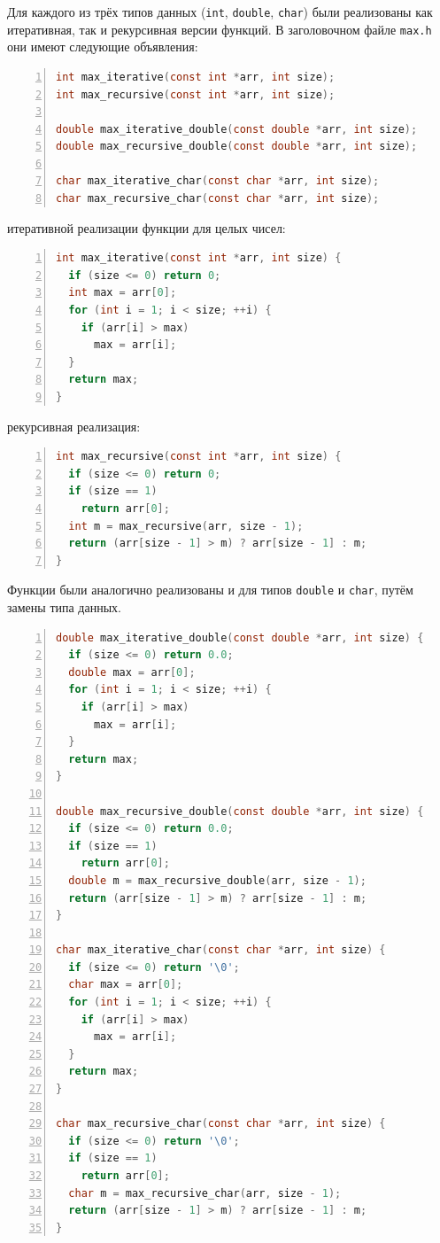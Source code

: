 Для каждого из трёх типов данных (\texttt{int}, \texttt{double}, \texttt{char}) были реализованы как итеративная, так и рекурсивная версии функций. В заголовочном файле \texttt{max.h} они имеют следующие объявления:

\begin{lstlisting}[language=C, numbers=left, caption=Заголовочный файл max.h]
int max_iterative(const int *arr, int size);
int max_recursive(const int *arr, int size);

double max_iterative_double(const double *arr, int size);
double max_recursive_double(const double *arr, int size);

char max_iterative_char(const char *arr, int size);
char max_recursive_char(const char *arr, int size);
\end{lstlisting}

 итеративной реализации функции для целых чисел:
\begin{lstlisting}[language=C, numbers=left, caption=Итеративная реализация max для int]
int max_iterative(const int *arr, int size) {
  if (size <= 0) return 0;
  int max = arr[0];
  for (int i = 1; i < size; ++i) {
    if (arr[i] > max)
      max = arr[i];
  }
  return max;
}
\end{lstlisting}

 рекурсивная реализация:
\begin{lstlisting}[language=C, numbers=left, caption=Рекурсивная реализация max для int]
int max_recursive(const int *arr, int size) {
  if (size <= 0) return 0;
  if (size == 1)
    return arr[0];
  int m = max_recursive(arr, size - 1);
  return (arr[size - 1] > m) ? arr[size - 1] : m;
}
\end{lstlisting}

Функции были аналогично реализованы и для типов \texttt{double} и \texttt{char}, путём замены типа данных.

\begin{lstlisting}[language=C, numbers=left, caption=Реализация max для double и char]
double max_iterative_double(const double *arr, int size) {
  if (size <= 0) return 0.0;
  double max = arr[0];
  for (int i = 1; i < size; ++i) {
    if (arr[i] > max)
      max = arr[i];
  }
  return max;
}

double max_recursive_double(const double *arr, int size) {
  if (size <= 0) return 0.0;
  if (size == 1)
    return arr[0];
  double m = max_recursive_double(arr, size - 1);
  return (arr[size - 1] > m) ? arr[size - 1] : m;
}

char max_iterative_char(const char *arr, int size) {
  if (size <= 0) return '\0';
  char max = arr[0];
  for (int i = 1; i < size; ++i) {
    if (arr[i] > max)
      max = arr[i];
  }
  return max;
}

char max_recursive_char(const char *arr, int size) {
  if (size <= 0) return '\0';
  if (size == 1)
    return arr[0];
  char m = max_recursive_char(arr, size - 1);
  return (arr[size - 1] > m) ? arr[size - 1] : m;
}
\end{lstlisting}

